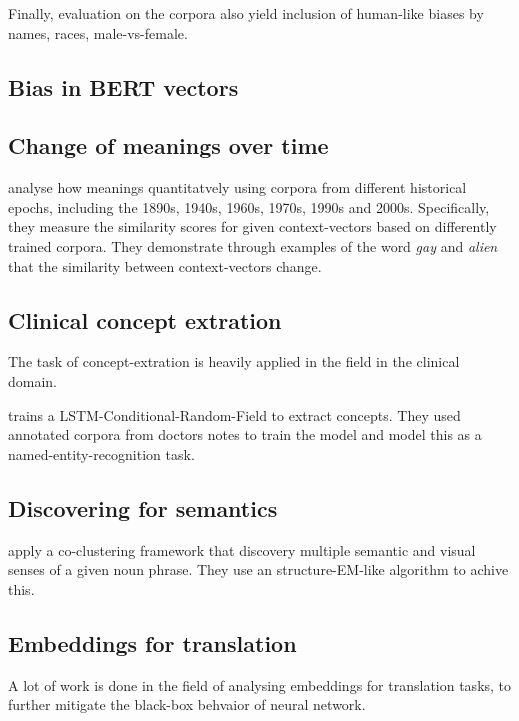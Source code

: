 \documentclass[a4paper,12pt,twoside,openright]{report}
\begin{document}
Finally, evaluation on the corpora also yield inclusion of human-like biases \cite{jentzsch19} by names, races, male-vs-female.

\subsection{Bias in BERT vectors}


\subsection{Change of meanings over time}

\cite{hu19} analyse how meanings quantitatvely using corpora from different historical epochs, including the 1890s, 1940s, 1960s, 1970s, 1990s and 2000s. 
Specifically, they measure the similarity scores for given context-vectors based on differently trained corpora.
They demonstrate through examples of the word \textit{gay} and \textit{alien} that the similarity between context-vectors change.

\subsection{Clinical concept extration}

The task of concept-extration is heavily applied in the field in the clinical domain.

\cite{zhu18} trains a LSTM-Conditional-Random-Field to extract concepts.
They used annotated corpora from doctors notes to train the model and model this as a named-entity-recognition task.


\subsection{Discovering for semantics}


\cite{chen19} apply a co-clustering framework that discovery multiple semantic and visual senses of a given noun phrase.
They use an structure-EM-like algorithm to achive this.

\subsection{Embeddings for translation}

A lot of work is done in the field of analysing embeddings for translation tasks, to further mitigate the black-box behvaior of neural network.
\end{document}
